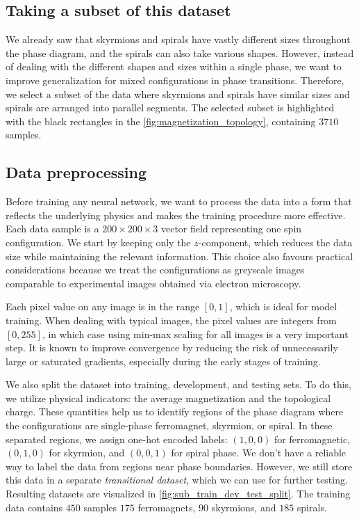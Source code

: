 \subsection{Taking a subset of this dataset}

We already saw that skyrmions and spirals have vastly different sizes throughout the phase diagram, and the spirals can also take various shapes. However, instead of dealing with the different shapes and sizes within a single phase, we want to improve generalization for mixed configurations in phase transitions. Therefore, we select a subset of the data where skyrmions and spirals have similar sizes and spirals are arranged into parallel segments. The selected subset is highlighted with the black rectangles in the \ref{fig:magnetization_topology}, containing $3710$ samples.

\subsection{Data preprocessing}

Before training any neural network, we want to process the data into a form that reflects the underlying physics and makes the training procedure more effective. Each data sample is a $200 \times 200 \times 3$ vector field representing  one spin configuration. We start by keeping only the $z$-component, which reduces the data size while maintaining the relevant information. This choice also favours practical considerations because we treat the configurations as greyscale images comparable to experimental images obtained via electron microscopy.

Each pixel value on any image is in the range $[0, 1]$, which is ideal for model training. When dealing with typical images, the pixel values are integers from $[0, 255]$, in which case using min-max scaling for all images is a very important step. It is known to improve convergence by reducing the risk of unnecessarily large or saturated gradients, especially during the early stages of training.

We also split the dataset into training, development, and testing sets. To do this, we utilize physical indicators: the average magnetization and the topological charge. These quantities help us to identify regions of the phase diagram where the configurations are single-phase ferromagnet, skyrmion, or spiral. In these separated regions, we assign one-hot encoded labels: $(1, 0, 0)$ for ferromagnetic, $(0, 1, 0)$ for skyrmion, and $(0, 0, 1)$ for spiral phase. We don't have a reliable way to label the data from regions near phase boundaries. However, we still store this data in a separate \emph{transitional dataset}, which we can use for further testing. Resulting datasets are visualized in \ref{fig:sub_train_dev_test_split}. The training data contains $450$ samples $175$ ferromagnets, $90$ skyrmions, and $185$ spirals.  


